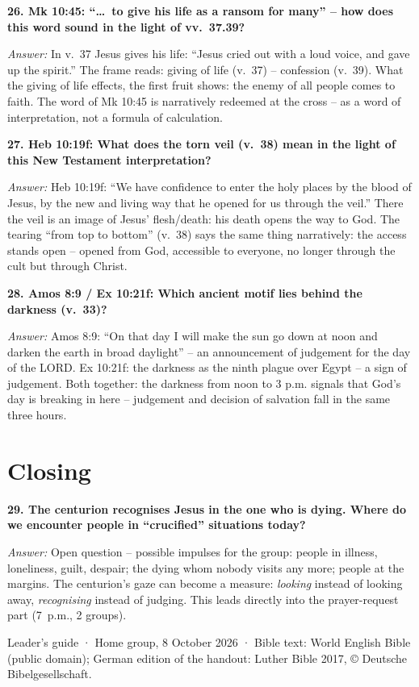 \documentclass[12pt,a4paper]{article}
\newcommand{\frage}[1]{\par\vspace{0.7em}\noindent\textbf{#1}\par}
\newcommand{\antwort}[1]{\par\noindent\textit{Answer:} #1\par}
\begin{document}
\frage{26. Mk 10:45: ``\ldots\ to give his life as a ransom for many'' -- how does this word sound in the light of vv.~37.39?}
\antwort{In v.~37 Jesus gives his life: ``Jesus cried out with a loud voice, and gave up the spirit.'' The frame reads: giving of life (v.~37) -- confession (v.~39). What the giving of life effects, the first fruit shows: the enemy of all people comes to faith. The word of Mk 10:45 is narratively redeemed at the cross -- as a word of interpretation, not a formula of calculation.}

\frage{27. Heb 10:19f: What does the torn veil (v.~38) mean in the light of this New Testament interpretation?}
\antwort{Heb 10:19f: ``We have confidence to enter the holy places by the blood of Jesus, by the new and living way that he opened for us through the veil.'' There the veil is an image of Jesus' flesh/death: his death opens the way to God. The tearing ``from top to bottom'' (v.~38) says the same thing narratively: the access stands open -- opened from God, accessible to everyone, no longer through the cult but through Christ.}

\frage{28. Amos 8:9 / Ex 10:21f: Which ancient motif lies behind the darkness (v.~33)?}
\antwort{Amos 8:9: ``On that day I will make the sun go down at noon and darken the earth in broad daylight'' -- an announcement of judgement for the day of the LORD. Ex 10:21f: the darkness as the ninth plague over Egypt -- a sign of judgement. Both together: the darkness from noon to 3 p.m. signals that God's day is breaking in here -- judgement and decision of salvation fall in the same three hours.}

\section*{Closing}

\frage{29. The centurion recognises Jesus in the one who is dying. Where do we encounter people in ``crucified'' situations today?}
\antwort{Open question -- possible impulses for the group: people in illness, loneliness, guilt, despair; the dying whom nobody visits any more; people at the margins. The centurion's gaze can become a measure: \emph{looking} instead of looking away, \emph{recognising} instead of judging. This leads directly into the prayer-request part (7~p.m., 2 groups).}

\vspace{1em}
{\footnotesize Leader's guide · Home group, 8 October 2026 · Bible text: World English Bible (public domain); German edition of the handout: Luther Bible 2017, © Deutsche Bibelgesellschaft.}
\end{document}
